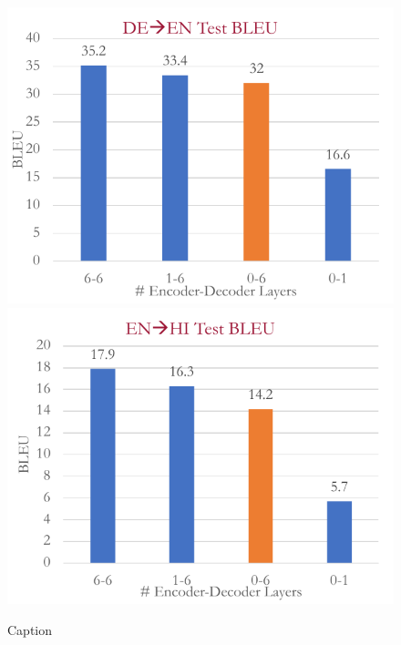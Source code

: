  \begin{figure}[h!t]
     \centering
     \includegraphics[width=0.45\linewidth]{img/misc/noencoder.deen.pdf}
     \includegraphics[width=0.45\linewidth]{img/misc/noencoder.enhi.pdf}
     
     \caption{Caption}
     \label{fig:my_label}
 \end{figure}
 
 
 
 